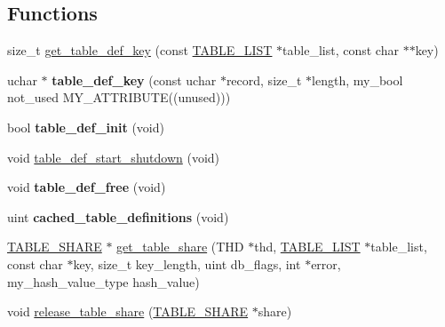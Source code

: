 \subsection*{Functions}
\begin{DoxyCompactItemize}
\item 
size\+\_\+t \mbox{\hyperlink{group__Data__Dictionary_ga14224b18bb5f7e175fde6932a590defa}{get\+\_\+table\+\_\+def\+\_\+key}} (const \mbox{\hyperlink{structTABLE__LIST}{T\+A\+B\+L\+E\+\_\+\+L\+I\+ST}} $\ast$table\+\_\+list, const char $\ast$$\ast$key)
\item 
\mbox{\label{group__Data__Dictionary_ga1d02e5bbc2f45e705339a4bd9b535fe7}} 
uchar $\ast$ {\bfseries table\+\_\+def\+\_\+key} (const uchar $\ast$record, size\+\_\+t $\ast$length, my\+\_\+bool not\+\_\+used M\+Y\+\_\+\+A\+T\+T\+R\+I\+B\+U\+TE((unused)))
\item 
\mbox{\label{group__Data__Dictionary_gad9f57ec544a178c11c18d6900e2dcf6c}} 
bool {\bfseries table\+\_\+def\+\_\+init} (void)
\item 
void \mbox{\hyperlink{group__Data__Dictionary_gabb94e7a0682741b06d662be41fae480f}{table\+\_\+def\+\_\+start\+\_\+shutdown}} (void)
\item 
\mbox{\label{group__Data__Dictionary_ga8b09d5446051abdac04bf96a4d6a0c12}} 
void {\bfseries table\+\_\+def\+\_\+free} (void)
\item 
\mbox{\label{group__Data__Dictionary_gabb76a30ed423c4cb98689fcedae48c60}} 
uint {\bfseries cached\+\_\+table\+\_\+definitions} (void)
\item 
\mbox{\hyperlink{structTABLE__SHARE}{T\+A\+B\+L\+E\+\_\+\+S\+H\+A\+RE}} $\ast$ \mbox{\hyperlink{group__Data__Dictionary_gad9c9e8583421876b16d148a82322e86e}{get\+\_\+table\+\_\+share}} (T\+HD $\ast$thd, \mbox{\hyperlink{structTABLE__LIST}{T\+A\+B\+L\+E\+\_\+\+L\+I\+ST}} $\ast$table\+\_\+list, const char $\ast$key, size\+\_\+t key\+\_\+length, uint db\+\_\+flags, int $\ast$error, my\+\_\+hash\+\_\+value\+\_\+type hash\+\_\+value)
\item 
void \mbox{\hyperlink{group__Data__Dictionary_ga0f27eb7444d2cec48296785a54e229f2}{release\+\_\+table\+\_\+share}} (\mbox{\hyperlink{structTABLE__SHARE}{T\+A\+B\+L\+E\+\_\+\+S\+H\+A\+RE}} $\ast$share)
\item 
$$
\end{DoxyCompactItemize}
